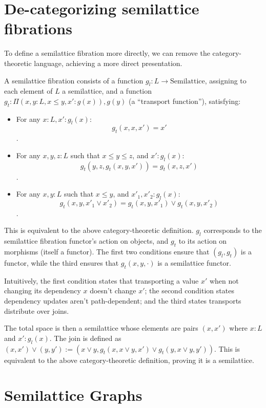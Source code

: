 \documentclass{article}
\begin{document}
    \section{De-categorizing semilattice fibrations}

      To define a semilattice fibration more directly, we can remove the category-theoretic language, achieving a more direct presentation.

      A semilattice fibration consists of a function $g_l : L \rightarrow \mathrm{Semilattice}$, assigning to each element of $L$ a semilattice, and a function $g_t : \Pi (x, y : L, x \leq y, x' : g(x)), g(y)$ (a ``transport function''), satisfying:

      \begin{itemize}
        \item For any $x : L, x' : g_l(x)$: $$g_t(x, x, x') = x'$$.
        \item For any $x, y, z : L$ such that $x \leq y \leq z$, and $x' : g_l(x)$: $$g_t(y, z, g_t(x, y, x')) = g_t(x, z, x')$$.
        \item For any $x, y : L$ such that $x \leq y$, and $x'_1, x'_2 : g_l(x)$: $$g_t(x, y, x'_1 \vee x'_2) = g_t(x, y, x'_1) \vee g_t(x, y, x'_2)$$.
      \end{itemize}

      This is equivalent to the above category-theoretic definition. $g_l$ corresponds to the semilattice fibration functor's action on objects, and $g_t$ to its action on morphisms (itself a functor). The first two conditions ensure that $(g_l, g_t)$ is a functor, while the third ensures that $g_t(x, y, \cdot)$ is a semilattice functor.

      Intuitively, the first condition states that transporting a value $x'$ when not changing its dependency $x$ doesn't change $x'$; the second condition states dependency updates aren't path-dependent; and the third states transports distribute over joins.

      The total space is then a semilattice whose elements are pairs $(x, x')$ where $x : L$ and $x' : g_l(x)$. The join is defined as $(x, x') \vee (y, y') := (x \vee y, g_t(x, x \vee y, x') \vee g_t(y, x \vee y, y'))$. This is equivalent to the above category-theoretic definition, proving it is a semilattice.

    \section{Semilattice Graphs}
\end{document}
